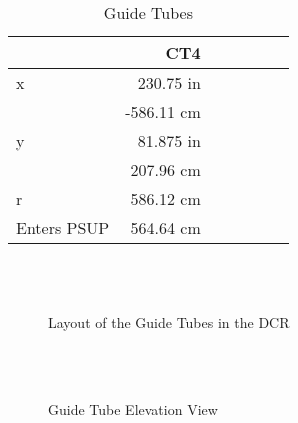   
  
\begin{table}
\begin{center}
\begin{tabular}{lrrrrrr}
  & CT4 \\
\hline
x &  230.75 in \\
  & -586.11 cm \\

y & 81.875 in \\
  & 207.96 cm \\
  
r & 586.12 cm \\
  
Enters PSUP & 564.64 cm \\

\end{tabular}
\caption[Guide Tubes]
        {Guide Tubes
        }
\end{center}
\end{table}
   
\begin{figure}
\begin{center}
\leavevmode
\epsfxsize=6.5in
~\\\
\caption[Guide Tube Layout In DCR]
        {Layout of the Guide Tubes in the DCR
        }
\end{center}
\end{figure} 
 
  
   
\begin{figure}
\begin{center}
\leavevmode
\epsfxsize=6.5in
~\\\
\caption[Guide Tube Elevation View]
        {Guide Tube Elevation View
        }
\end{center}
\end{figure} 
 
  
